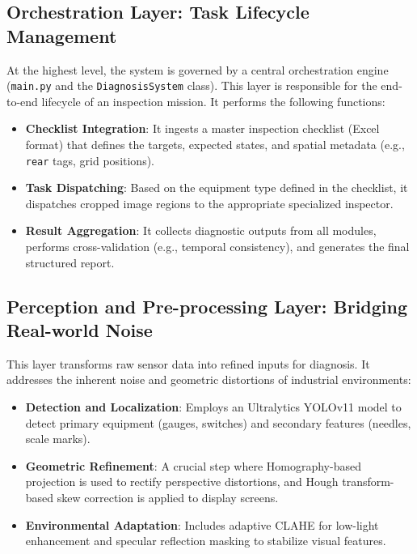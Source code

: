 \subsection{Orchestration Layer: Task Lifecycle Management}
At the highest level, the system is governed by a central orchestration engine (\texttt{main.py} and the \texttt{DiagnosisSystem} class). This layer is responsible for the end-to-end lifecycle of an inspection mission. It performs the following functions:
\begin{itemize}
    \item \textbf{Checklist Integration}: It ingests a master inspection checklist (Excel format) that defines the targets, expected states, and spatial metadata (e.g., \texttt{rear} tags, grid positions).
    \item \textbf{Task Dispatching}: Based on the equipment type defined in the checklist, it dispatches cropped image regions to the appropriate specialized inspector.
    \item \textbf{Result Aggregation}: It collects diagnostic outputs from all modules, performs cross-validation (e.g., temporal consistency), and generates the final structured report.
\end{itemize}

\subsection{Perception and Pre-processing Layer: Bridging Real-world Noise}
This layer transforms raw sensor data into refined inputs for diagnosis. It addresses the inherent noise and geometric distortions of industrial environments:
\begin{itemize}
    \item \textbf{Detection and Localization}: Employs an Ultralytics YOLOv11 model to detect primary equipment (gauges, switches) and secondary features (needles, scale marks).
    \item \textbf{Geometric Refinement}: A crucial step where Homography-based projection is used to rectify perspective distortions, and Hough transform-based skew correction is applied to display screens.
    \item \textbf{Environmental Adaptation}: Includes adaptive CLAHE for low-light enhancement and specular reflection masking to stabilize visual features.
\end{itemize}

